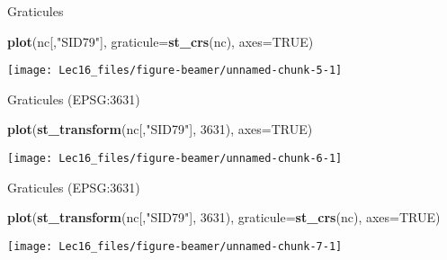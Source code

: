 \documentclass[11pt,ignorenonframetext,]{beamer}
\newenvironment{Shaded}{}{}
\newcommand{\DataTypeTok}[1]{\textcolor[rgb]{0.56,0.13,0.00}{#1}}
\newcommand{\DecValTok}[1]{\textcolor[rgb]{0.25,0.63,0.44}{#1}}
\newcommand{\KeywordTok}[1]{\textcolor[rgb]{0.00,0.44,0.13}{\textbf{#1}}}
\newcommand{\NormalTok}[1]{#1}
\newcommand{\OtherTok}[1]{\textcolor[rgb]{0.00,0.44,0.13}{#1}}
\newcommand{\StringTok}[1]{\textcolor[rgb]{0.25,0.44,0.63}{#1}}
\let\oldShaded\Shaded
\let\endoldShaded\endShaded
\renewenvironment{Shaded}{\footnotesize\begin{spacing}{0.9}\oldShaded}{\endoldShaded\end{spacing}}
\let\oldverbatim\verbatim
\let\endoldverbatim\endverbatim
\newcommand{\scriptoutput}{
  \renewenvironment{Shaded}{\scriptsize\begin{spacing}{0.9}\oldShaded}{\endoldShaded\end{spacing}}
  \renewenvironment{verbatim}{\scriptsize\begin{spacing}{0.9}\oldverbatim}{\endoldverbatim\end{spacing}}
}
\begin{document}
\begin{frame}[fragile,t]{Graticules}
\protect\hypertarget{graticules-1}{}

\scriptoutput

\begin{Shaded}
\begin{Highlighting}[]
\KeywordTok{plot}\NormalTok{(nc[,}\StringTok{"SID79"}\NormalTok{], }\DataTypeTok{graticule=}\KeywordTok{st_crs}\NormalTok{(nc), }\DataTypeTok{axes=}\OtherTok{TRUE}\NormalTok{)}
\end{Highlighting}
\end{Shaded}

\begin{center}\texttt{[image: Lec16\_files/figure-beamer/unnamed-chunk-5-1]} \end{center}

\end{frame}

\begin{frame}[fragile,t]{Graticules (EPSG:3631)}
\protect\hypertarget{graticules-epsg3631}{}

\scriptoutput

\begin{Shaded}
\begin{Highlighting}[]
\KeywordTok{plot}\NormalTok{(}\KeywordTok{st_transform}\NormalTok{(nc[,}\StringTok{"SID79"}\NormalTok{], }\DecValTok{3631}\NormalTok{), }\DataTypeTok{axes=}\OtherTok{TRUE}\NormalTok{)}
\end{Highlighting}
\end{Shaded}

\begin{center}\texttt{[image: Lec16\_files/figure-beamer/unnamed-chunk-6-1]} \end{center}

\end{frame}

\begin{frame}[fragile,t]{Graticules (EPSG:3631)}
\protect\hypertarget{graticules-epsg3631-1}{}

\scriptoutput

\begin{Shaded}
\begin{Highlighting}[]
\KeywordTok{plot}\NormalTok{(}\KeywordTok{st_transform}\NormalTok{(nc[,}\StringTok{"SID79"}\NormalTok{], }\DecValTok{3631}\NormalTok{), }\DataTypeTok{graticule=}\KeywordTok{st_crs}\NormalTok{(nc), }\DataTypeTok{axes=}\OtherTok{TRUE}\NormalTok{)}
\end{Highlighting}
\end{Shaded}

\begin{center}\texttt{[image: Lec16\_files/figure-beamer/unnamed-chunk-7-1]} \end{center}

\end{frame}
\end{document}
